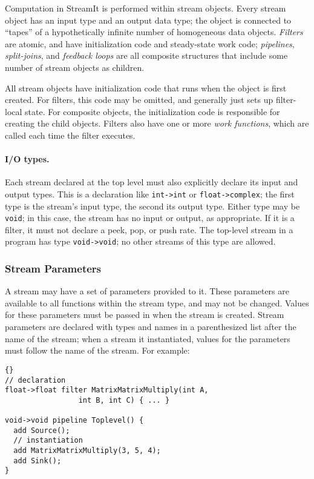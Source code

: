 \documentclass[11pt]{article}
\begin{document}
Computation in StreamIt is performed within stream objects.  Every
stream object has an input type and an output data type; the object is
connected to ``tapes'' of a hypothetically infinite number of
homogeneous data objects.  \emph{Filters} are atomic, and have
initialization code and steady-state work code; \emph{pipelines},
\emph{split-joins}, and \emph{feedback loops} are all composite
structures that include some number of stream objects as children.

All stream objects have initialization code that runs when the object
is first created.  For filters, this code may be omitted, and
generally just sets up filter-local state.  For composite objects, the
initialization code is responsible for creating the child objects.
Filters also have one or more \emph{work functions}, which are called
each time the filter executes.

\paragraph{I/O types.}  Each stream declared at the top level must
also explicitly declare its input and output types.  This is a
declaration like \lstinline|int->int| or \lstinline|float->complex|;
the first type is the stream's input type, the second its output type.
Either type may be \lstinline|void|; in this case, the stream has no
input or output, as appropriate.  If it is a filter, it must not
declare a peek, pop, or push rate.  The top-level stream in a
program has type \lstinline|void->void|; no other streams of this type
are allowed.

\subsubsection{Stream Parameters}

A stream may have a set of parameters provided to it.  These
parameters are available to all functions within the stream type, and
may not be changed.  Values for these parameters must be passed in
when the stream is created.  Stream parameters are declared with types
and names in a parenthesized list after the name of the stream; when a
stream it instantiated, values for the parameters must follow the name
of the stream.  For example:

\begin{lstlisting}{}
// declaration
float->float filter MatrixMatrixMultiply(int A,
                 int B, int C) { ... }

void->void pipeline Toplevel() {
  add Source();
  // instantiation
  add MatrixMatrixMultiply(3, 5, 4);
  add Sink();
}
\end{lstlisting}
\end{document}
